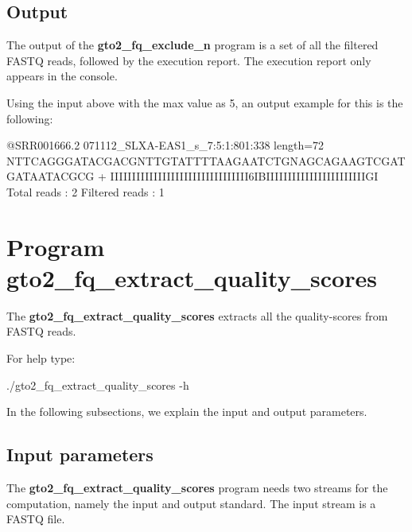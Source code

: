 \documentclass[11pt,]{krantz}
\newenvironment{Shaded}{\begin{snugshade}}{\end{snugshade}}
\newcommand{\ExtensionTok}[1]{#1}
\newcommand{\NormalTok}[1]{#1}
\begin{document}
\subsection*{Output}\label{output-2}


The output of the \textbf{gto2\_fq\_exclude\_n} program is a set of all
the filtered FASTQ reads, followed by the execution report. The
execution report only appears in the console.

Using the input above with the max value as 5, an output example for
this is the following:

\begin{Shaded}
\begin{Highlighting}[]
\ExtensionTok{@SRR001666.2}\NormalTok{ 071112_SLXA-EAS1_s_7:5:1:801:338 length=72}
\ExtensionTok{NTTCAGGGATACGACGNTTGTATTTTAAGAATCTGNAGCAGAAGTCGATGATAATACGCG}
\ExtensionTok{+}
\ExtensionTok{IIIIIIIIIIIIIIIIIIIIIIIIIIIIIIII6IBIIIIIIIIIIIIIIIIIIIIIIIGI}
\ExtensionTok{Total}\NormalTok{ reads    : 2}
\ExtensionTok{Filtered}\NormalTok{ reads : 1}
\end{Highlighting}
\end{Shaded}

\section{Program
gto2\_fq\_extract\_quality\_scores}\label{program-gto2_fq_extract_quality_scores}

The \textbf{gto2\_fq\_extract\_quality\_scores} extracts all the
quality-scores from FASTQ reads.

For help type:

\begin{Shaded}
\begin{Highlighting}[]
\ExtensionTok{./gto2_fq_extract_quality_scores}\NormalTok{ -h}
\end{Highlighting}
\end{Shaded}

In the following subsections, we explain the input and output
parameters.

\subsection*{Input parameters}\label{input-parameters-3}


The \textbf{gto2\_fq\_extract\_quality\_scores} program needs two
streams for the computation, namely the input and output standard. The
input stream is a FASTQ file.
\end{document}
